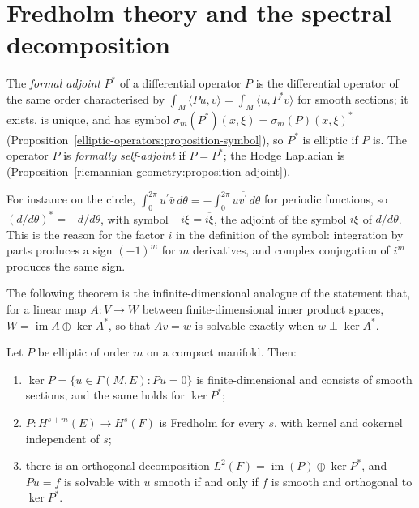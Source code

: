 \section{Fredholm theory and the spectral decomposition}\label{elliptic-operators:section-fredholm}

\begin{definition}\label{elliptic-operators:definition-formal-adjoint}
The \emph{formal adjoint} $P^*$ of a differential operator $P$ is the differential operator of the same order characterised by $\int_M\langle Pu, v\rangle = \int_M\langle u, P^*v\rangle$ for smooth sections;
it exists, is unique, and has symbol $\sigma_m(P^*)(x, \xi) = \sigma_m(P)(x, \xi)^*$ (Proposition~\ref{elliptic-operators:proposition-symbol}), so $P^*$ is elliptic if $P$ is. The operator $P$ is \emph{formally self-adjoint} if $P = P^*$; the Hodge Laplacian
is (Proposition~\ref{riemannian-geometry:proposition-adjoint}).
\end{definition}

For instance on the circle, $\int_0^{2\pi}u^{\prime}\bar v\,d\theta = -\int_0^{2\pi}u\overline{v^{\prime}}\,d\theta$ for periodic functions, so $(d/d\theta)^* = -d/d\theta$, with symbol $-i\xi = \overline{i\xi}$, the
adjoint of the symbol $i\xi$ of $d/d\theta$. This is the reason for the factor $i$ in the definition of the symbol: integration by parts produces a sign $(-1)^m$ for $m$ derivatives, and complex
conjugation of $i^m$ produces the same sign.

The following theorem is the infinite-dimensional analogue of the statement that, for a linear map $A \colon V \to W$ between finite-dimensional inner product spaces, $W = \operatorname{im}A \oplus \ker A^*$, so
that $Av = w$ is solvable exactly when $w \perp \ker A^*$.

\begin{theorem}\label{elliptic-operators:theorem-fredholm}
Let $P$ be elliptic of order $m$ on a compact manifold. Then:
\begin{enumerate}
\item $\ker P = \{u \in \Gamma(M, E) : Pu = 0\}$ is finite-dimensional and consists of smooth sections, and the same holds for $\ker P^*$;
\item $P \colon H^{s+m}(E) \to H^s(F)$ is Fredholm for every $s$, with kernel and cokernel independent of $s$;
\item there is an orthogonal decomposition $L^2(F) = \operatorname{im}(P) \oplus \ker P^*$, and $Pu = f$ is solvable with $u$ smooth if and only if $f$ is smooth and orthogonal to $\ker P^*$.
\end{enumerate}
\end{theorem}

